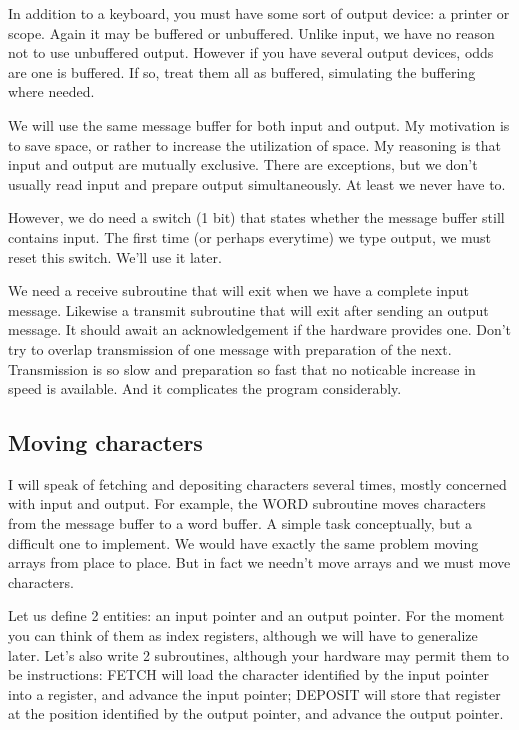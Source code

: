 \documentclass[b5paper, oneside]{book}
\begin{document}
In addition to a keyboard, you must have some sort of output device: a printer or scope. Again it may be buffered or unbuffered. Unlike input, we have no reason not to use unbuffered output. However if you have several output devices, odds are one is buffered. If so, treat them all as buffered, simulating the buffering where needed.

We will use the same message buffer for both input and output. My motivation is to save space, or rather to increase the utilization of space. My reasoning is that input and output are mutually exclusive. There are exceptions, but we don't usually read input and prepare output simultaneously. At least we never have to.

However, we do need a switch (1 bit) that states whether the message buffer still contains input. The first time (or perhaps everytime) we type output, we must reset this switch. We'll use it later.

We need a receive subroutine that will exit when we have a complete input message. Likewise a transmit subroutine that will exit after sending an output message. It should await an acknowledgement if the hardware provides one. Don't try to overlap transmission of one message with preparation of the next. Transmission is so slow and preparation so fast that no noticable increase in speed is available. And it complicates the program considerably.

\subsection{Moving characters}
I will speak of fetching and depositing characters several times, mostly concerned with input and output. For example, the WORD subroutine moves characters from the message buffer to a word buffer. A simple task conceptually, but a difficult one to implement. We would have exactly the same problem moving arrays from place to place. But in fact we needn't move arrays and we must move characters.

Let us define 2 entities: an input pointer and an output pointer. For the moment you can think of them as index registers, although we will have to generalize later. Let's also write 2 subroutines, although your hardware may permit them to be instructions: FETCH will load the character identified by the input pointer into a register, and advance the input pointer; DEPOSIT will store that register at the position identified by the output pointer, and advance the output pointer.
\end{document}
